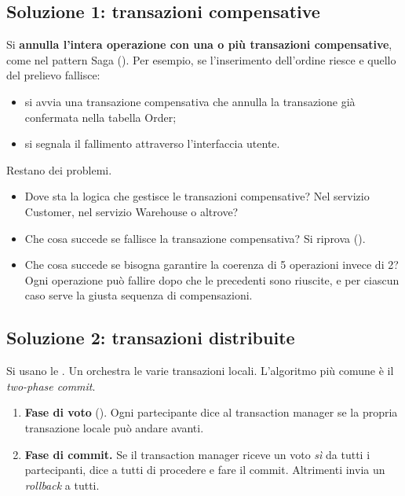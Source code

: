 \subsection{Soluzione 1: transazioni compensative}

Si \textbf{annulla l'intera operazione con una o più transazioni compensative}, come nel pattern Saga
(). Per esempio, se l'inserimento dell'ordine riesce e quello del prelievo fallisce:
\begin{itemize}
  \item si avvia una transazione compensativa che annulla la transazione già confermata nella tabella Order;
  \item si segnala il fallimento attraverso l'interfaccia utente.
\end{itemize}
Restano dei problemi.
\begin{itemize}
  \item Dove sta la logica che gestisce le transazioni compensative? Nel servizio Customer, nel servizio Warehouse o
    altrove?
  \item Che cosa succede se fallisce la transazione compensativa? Si riprova ().
  \item Che cosa succede se bisogna garantire la coerenza di 5 operazioni invece di 2? Ogni operazione può fallire
    dopo che le precedenti sono riuscite, e per ciascun caso serve la giusta sequenza di compensazioni.
\end{itemize}

\subsection{Soluzione 2: transazioni distribuite}

Si usano le . Un  orchestra le varie transazioni locali.
L'algoritmo più comune è il \emph{two-phase commit}.

\begin{algoritmo}
\begin{enumerate}
  \item \textbf{Fase di voto} (). Ogni partecipante dice al transaction manager se la propria
    transazione locale può andare avanti.
  \item \textbf{Fase di commit.} Se il transaction manager riceve un voto \emph{sì} da tutti i partecipanti, dice a
    tutti di procedere e fare il commit. Altrimenti invia un \emph{rollback} a tutti.
\end{enumerate}
\end{algoritmo}

